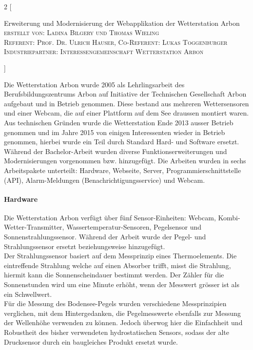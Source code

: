 \documentclass[10pt]{article}
\begin{document}
\begin{multicols}{2}
[
    \begin{center}
      {\huge\sffamily \Large Erweiterung und Modernisierung der Webapplikation der Wetterstation Arbon}\\
       \vspace{2ex}
       \textsc{erstellt von: Ladina Bilgery und Thomas Wieling}\\
       \textsc{Referent: Prof. Dr. Ulrich Hauser, Co-Referent: Lukas Toggenburger}\\
       \textsc{Industriepartner: Interessengemeinschaft Wetterstation Arbon}      
    \end{center}
]

Die Wetterstation Arbon wurde 2005 als Lehrlingsarbeit des Berufsbildungszentrums Arbon auf Initiative der Technischen Gesellschaft Arbon aufgebaut und in Betrieb genommen. Diese bestand aus mehreren Wettersensoren und einer Webcam, die auf einer Plattform auf dem See draussen montiert waren. Aus technischen Gründen wurde die Wetterstation Ende 2013 ausser Betrieb genommen und im Jahre 2015 von einigen Interessenten wieder in Betrieb genommen, hierbei wurde ein Teil durch Standard Hard- und Software ersetzt. Während der Bachelor-Arbeit wurden diverse Funktionserweiterungen und Modernisierungen vorgenommen bzw. hinzugefügt. Die Arbeiten wurden in sechs Arbeitspakete unterteilt: Hardware, Webseite, Server, Programmierschnittstelle (API), Alarm-Meldungen (Benachrichtigungsservice) und Webcam.
\paragraph{Hardware}
Die Wetterstation Arbon verfügt über fünf Sensor-Einheiten: Webcam, Kombi-Wetter-Transmitter, Wassertemperatur-Sensoren, Pegelsensor und Sonnenstrahlungssensor. Während der Arbeit wurde der Pegel- und Strahlungssensor ersetzt beziehungsweise hinzugefügt.\\ 
Der Strahlungssensor basiert auf dem Messprinzip eines Thermoelements. Die eintreffende Strahlung welche auf einen Absorber trifft, misst die Strahlung, hiermit kann die Sonnenscheindauer bestimmt werden. Der Zähler für die Sonnenstunden wird um eine Minute erhöht, wenn der Messwert grösser ist als ein Schwellwert.\\
Für die Messung des Bodensee-Pegels wurden verschiedene Messprinzipien verglichen, mit dem Hintergedanken, die Pegelmesswerte ebenfalls zur Messung der Wellenhöhe verwenden zu können. Jedoch überwog hier die Einfachheit und Robustheit des bisher verwendeten hydrostatischen Sensors, sodass der alte Drucksensor durch ein baugleiches Produkt ersetzt wurde. 


\end{multicols}
\end{document}

